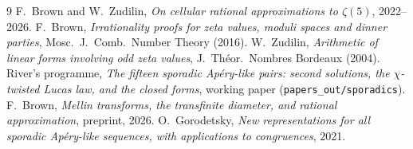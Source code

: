 \documentclass[11pt,reqno]{amsart}
\theoremstyle{plain}
\theoremstyle{definition}
\theoremstyle{remark}
\begin{document}
\begin{thebibliography}{9}
 F.~Brown and W.~Zudilin,
\emph{On cellular rational approximations to $\zeta(5)$}, 2022--2026.
 F.~Brown,
\emph{Irrationality proofs for zeta values, moduli spaces and dinner
parties}, Mosc.\ J.\ Comb.\ Number Theory (2016).
 W.~Zudilin,
\emph{Arithmetic of linear forms involving odd zeta values},
J.\ Th\'eor.\ Nombres Bordeaux (2004).
 River's programme,
\emph{The fifteen sporadic Ap\'ery-like pairs: second solutions, the
$\chi$-twisted Lucas law, and the closed forms}, working paper
(\texttt{papers\_out/sporadics}).
 F.~Brown,
\emph{Mellin transforms, the transfinite diameter, and rational
approximation}, preprint, 2026.
 O.~Gorodetsky,
\emph{New representations for all sporadic Ap\'ery-like sequences, with
applications to congruences}, 2021.
\end{thebibliography}
\end{document}
